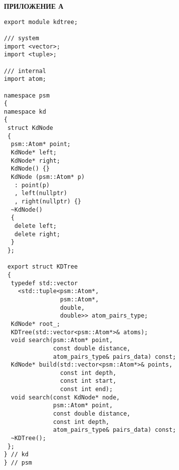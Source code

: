\newpage
\begin{center}
  \textbf{\large ПРИЛОЖЕНИЕ А}
\end{center}


\begin{lstlisting}[caption={Интерфейс модуля k-d дерево}, captionpos=b]
export module kdtree;

/// system
import <vector>;
import <tuple>;

/// internal
import atom;

namespace psm
{
namespace kd
{
 struct KdNode
 {
  psm::Atom* point;
  KdNode* left;
  KdNode* right;
  KdNode() {}
  KdNode (psm::Atom* p)
   : point(p)
   , left(nullptr)
   , right(nullptr) {}
  ~KdNode()
  {
   delete left;
   delete right;
  }
 };

 export struct KDTree
 {
  typedef std::vector
    <std::tuple<psm::Atom*,
                psm::Atom*,
                double,
                double>> atom_pairs_type;
  KdNode* root_;
  KDTree(std::vector<psm::Atom*>& atoms);
  void search(psm::Atom* point,
              const double distance,
  			  atom_pairs_type& pairs_data) const;
  KdNode* build(std::vector<psm::Atom*>& points, 
                const int depth, 
                const int start,
                const int end);
  void search(const KdNode* node,
              psm::Atom* point,
              const double distance,
              const int depth,
              atom_pairs_type& pairs_data) const;
  ~KDTree();
 };
} // kd
} // psm
\end{lstlisting}


\newpage


